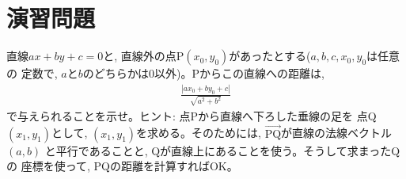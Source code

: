 \section*{演習問題}

\begin{exq}\label{exq:point_line_distance} 直線$ax+by+c=0$と, 
直線外の点P$(x_0, y_0)$があったとする($a, b, c, x_0, y_0$は任意の
定数で, $a$と$b$のどちらかは0以外)。Pからこの直線への距離は, 
\begin{eqnarray}
\frac{|ax_0+by_0+c|}{\sqrt{a^2+b^2}}
\end{eqnarray}
で与えられることを示せ。ヒント: 点Pから直線へ下ろした垂線の足を
点Q$(x_1, y_1)$として, $(x_1, y_1)$を求める。そのためには, 
$\overrightarrow{\text{PQ}}$が直線の法線ベクトル$(a, b)$
と平行であることと, Qが直線上にあることを使う。そうして求まったQの
座標を使って, PQの距離を計算すればOK。\end{exq}
\hv


